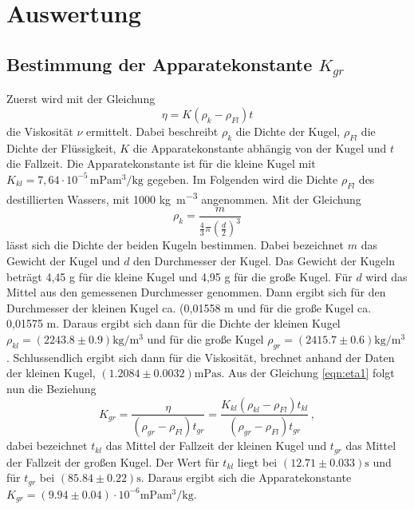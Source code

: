 \section{Auswertung}
\label{sec:Auswertung}
\subsection{Bestimmung der Apparatekonstante \texorpdfstring{$K_{gr}$}{math}}
\label{sec:BdA}
Zuerst wird mit der Gleichung
\begin{equation}
  \eta = K (\rho_k - \rho_{Fl})t
  \label{eqn:eta1}
\end{equation}
die Viskosität $\nu$ ermittelt. Dabei beschreibt $\rho_k$ die Dichte der Kugel,
$\rho_{Fl}$ die Dichte der Flüssigkeit, $K$ die Apparatekonstante abhängig von
der Kugel und $t$ die Fallzeit.
Die Apparatekonstante ist für die kleine Kugel mit $K_{kl} = 7,64 \cdot 10^{-5}
\,\si{\milli\pascal\meter\tothe{3}\per\kilo\gram} $
gegeben. Im Folgenden wird die Dichte $\rho_{Fl}$ des destillierten Wassers, mit
1000 \si{\kilo\gram\per\meter\tothe{3}} angenommen. Mit der Gleichung
\begin{equation*}
  \rho_{k} = \frac{m}{\frac{4}{3}\pi\left(\frac{d}{2}\right)^3}
\end{equation*}
lässt sich die Dichte der beiden Kugeln bestimmen. Dabei bezeichnet $m$ das
Gewicht der Kugel und $d$ den Durchmesser der Kugel. Das Gewicht der Kugeln
beträgt 4,45 \si{\gram} für die kleine Kugel und 4,95 \si{\gram} für die große
Kugel. Für $d$ wird das Mittel aus den gemessenen Durchmesser genommen. Dann
ergibt sich für den Durchmesser der kleinen Kugel ca. (0,01558 \si{\meter} und
für die große Kugel ca. 0,01575 \si{\meter}.
Daraus ergibt sich dann für die Dichte der kleinen Kugel $\rho_{kl} =
(2243.8 \pm 0.9) \si{\kilo\gram\per\meter\tothe{3}}$ und für die große Kugel
$\rho_{gr} = (2415.7 \pm 0.6) \si{\kilo\gram\per\meter\tothe{3}} $.
Schlussendlich ergibt sich dann
für die Viskosität, brechnet anhand der Daten der kleinen Kugel,
$(1.2084 \pm 0.0032)\si{\milli\pascal\second}$.
Aus der Gleichung \eqref{eqn:eta1} folgt nun die Beziehung
\begin{equation*}
  K_{gr} = \frac{\eta}{(\rho_{gr} - \rho_{Fl})t_{gr}}
        = \frac{K_{kl} (\rho_{kl} - \rho_{Fl})t_{kl}}{(\rho_{gr} - \rho_{Fl})t_{gr}}\, ,
\end{equation*}
dabei bezeichnet $t_{kl}$ das Mittel der Fallzeit der kleinen Kugel und $t_{gr}$
das Mittel der Fallzeit der großen Kugel. Der Wert für $t_{kl}$ liegt bei
$(12.71 \pm 0.033) \si{\second}$ und für $t_{gr}$ bei $(85.84 \pm 0.22)
\si{\second}$. Daraus ergibt sich die Apparatekonstante $K_{gr}  = (9.94 \pm 0.04)
\cdot 10^{-6} \si{\milli\pascal\meter\tothe{3}\per\kilo\gram}$.
